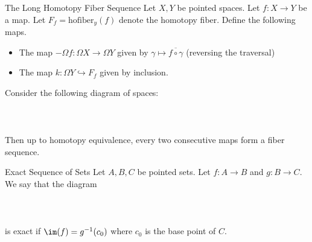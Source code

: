 \documentclass[a4paper]{article}
\begin{document}
\begin{thm}{The Long Homotopy Fiber Sequence}{} Let $X,Y$ be pointed spaces. Let $f:X\to Y$ be a map. Let $F_f=\text{hofiber}_y(f)$ denote the homotopy fiber. Define the following maps. 
\begin{itemize}
\item The map $-\Omega f:\Omega X\to\Omega Y$ given by $\gamma\mapsto\overline{f\circ\gamma}$ (reversing the traversal)
\item The map $k:\Omega Y\hookrightarrow F_f$ given by inclusion. 
\end{itemize}
Consider the following diagram of spaces: \\~\\
\\~\\
Then up to homotopy equivalence, every two consecutive maps form a fiber sequence. 
\end{thm}

\begin{defn}{Exact Sequence of Sets}{} Let $A,B,C$ be pointed sets. Let $f:A\to B$ and $g:B\to C$. We say that the diagram \\~\\
\\~\\
is exact if $\im(f)=g^{-1}(c_0)$ where $c_0$ is the base point of $C$. 
\end{defn}
\end{document}
